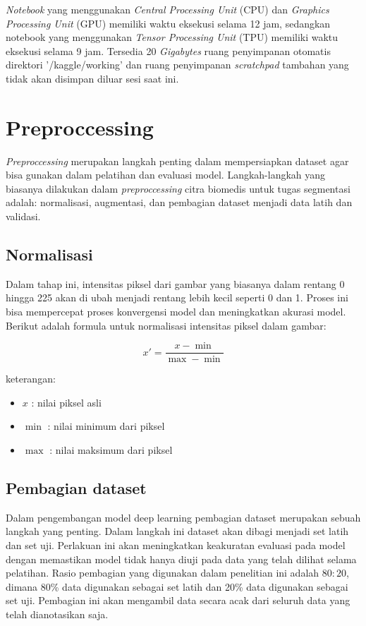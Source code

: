 \noindent \textit{Notebook} yang menggunakan \textit{Central Processing Unit }(CPU) dan \textit{Graphics Processing Unit} (GPU) memiliki waktu eksekusi selama 12 jam, sedangkan notebook yang menggunakan \textit{Tensor Processing Unit} (TPU) memiliki waktu eksekusi selama 9 jam. Tersedia 20 \textit{Gigabytes} ruang penyimpanan otomatis direktori '/kaggle/working' dan ruang penyimpanan \textit{scratchpad} tambahan yang tidak akan disimpan diluar sesi saat ini.


\section{Preproccessing}

\noindent \textit{Preproccessing} merupakan langkah penting dalam mempersiapkan dataset agar bisa gunakan dalam pelatihan dan evaluasi model. Langkah-langkah yang biasanya dilakukan dalam \textit{preproccessing} citra biomedis untuk tugas segmentasi adalah: normalisasi, augmentasi, dan pembagian dataset menjadi data latih dan validasi.

\subsection{Normalisasi}

\noindent Dalam tahap ini, intensitas piksel dari gambar yang biasanya dalam rentang 0 hingga 225 akan di ubah menjadi rentang lebih kecil seperti 0 dan 1. Proses ini bisa mempercepat proses konvergensi model dan meningkatkan akurasi model. Berikut adalah formula untuk normalisasi intensitas piksel dalam gambar:

\begin{equation}
	x' = \frac{x - \min}{\max - \min}
\end{equation}

\noindent
keterangan:
\begin{itemize}
	\item $x$ : nilai piksel asli
	\item $\min$ : nilai minimum dari piksel
	\item $\max$ : nilai maksimum dari piksel
\end{itemize}


\subsection{Pembagian dataset}

\noindent Dalam pengembangan model deep learning pembagian dataset merupakan sebuah langkah yang penting. Dalam langkah ini dataset akan dibagi menjadi set latih dan set uji. Perlakuan ini akan meningkatkan keakuratan evaluasi pada model dengan memastikan model tidak hanya diuji pada data yang telah dilihat selama pelatihan. Rasio pembagian yang digunakan dalam penelitian ini adalah \(80:20\), dimana 80\% data digunakan sebagai set latih dan 20\% data digunakan sebagai set uji. Pembagian ini akan mengambil data secara acak dari seluruh data yang telah dianotasikan saja. 

